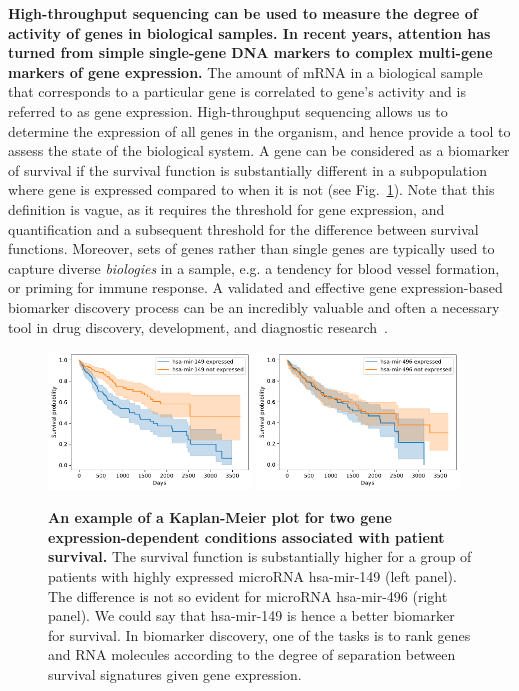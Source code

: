 \documentclass[11pt,a4paper]{article}
\renewcommand{\bold}{\textbf}
\begin{document}
\bold{High-throughput sequencing can be used to measure the degree of activity of genes in biological samples. In recent years, attention has turned from simple single-gene DNA markers to complex multi-gene markers of gene expression.} The amount of mRNA in a biological sample that corresponds to a particular gene is correlated to gene's activity and is referred to as gene expression. High-throughput sequencing allows us to determine the expression of all genes in the organism, and hence provide a tool to assess the state of the biological system. A gene can be considered as a biomarker of survival if the survival function is substantially different in a subpopulation where gene is expressed compared to when it is not (see Fig.~\ref{fig:km-marker}). Note that this definition is vague, as it requires the threshold for gene expression, and quantification and a subsequent threshold for the difference between survival functions. Moreover, sets of genes rather than single genes are typically used to capture diverse {\em biologies} in a sample, e.g. a tendency for blood vessel formation, or priming for immune response. A validated and effective gene expression-based biomarker discovery process can be an incredibly valuable and often a necessary tool in drug discovery, development, and diagnostic research~\cite{MonforteMcPhail2005}.

\begin{figure}
\includegraphics[width=0.48\textwidth]{hsa-mir-149}\hfill
\includegraphics[width=0.48\textwidth]{hsa-mir-496}
\caption{\small\bold{An example of a Kaplan-Meier plot for two gene expression-dependent conditions associated with patient survival.} The survival function is substantially higher for a group of patients with highly expressed microRNA hsa-mir-149 (left panel). The difference is not so evident for microRNA hsa-mir-496 (right panel). We could say that hsa-mir-149 is hence a better biomarker for survival. In biomarker discovery, one of the tasks is to rank genes and RNA molecules according to the degree of separation between survival signatures given gene expression.}
\label{fig:km-marker}
\end{figure}
\end{document}
